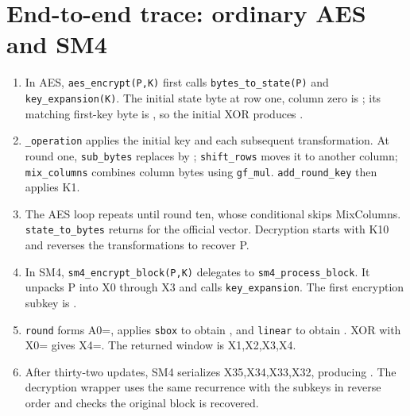 \section{End-to-end trace: ordinary AES and SM4}
\begin{enumerate}
\item In AES, \texttt{aes\_\allowbreak{}encrypt(P,K)} first calls \texttt{bytes\_\allowbreak{}to\_\allowbreak{}state(P)} and \texttt{key\_\allowbreak{}expansion(K)}. The initial state byte at row one, column zero is ; its matching first-key byte is , so the initial XOR produces .
\item \texttt{\_\allowbreak{}operation} applies the initial key and each subsequent transformation. At round one, \texttt{sub\_\allowbreak{}bytes} replaces  by ; \texttt{shift\_\allowbreak{}rows} moves it to another column; \texttt{mix\_\allowbreak{}columns} combines column bytes using \texttt{gf\_\allowbreak{}mul}. \texttt{add\_\allowbreak{}round\_\allowbreak{}key} then applies K1.
\item The AES loop repeats until round ten, whose conditional skips MixColumns. \texttt{state\_\allowbreak{}to\_\allowbreak{}bytes} returns  for the official vector. Decryption starts with K10 and reverses the transformations to recover P.
\item In SM4, \texttt{sm4\_\allowbreak{}encrypt\_\allowbreak{}block(P,K)} delegates to \texttt{sm4\_\allowbreak{}process\_\allowbreak{}block}. It unpacks P into X0 through X3 and calls \texttt{key\_\allowbreak{}expansion}. The first encryption subkey is .
\item \texttt{round} forms A0=, applies \texttt{sbox} to obtain , and \texttt{linear} to obtain . XOR with X0= gives X4=. The returned window is X1,X2,X3,X4.
\item After thirty-two updates, SM4 serializes X35,X34,X33,X32, producing . The decryption wrapper uses the same recurrence with the subkeys in reverse order and checks the original block is recovered.
\end{enumerate}

